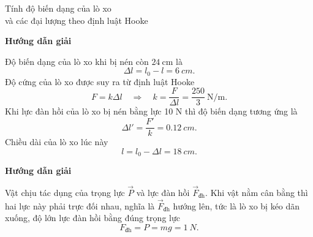 \begin{dang}{Tính độ biến dạng của lò xo \\và các đại lượng theo định luật Hooke}
	{	\begin{center}
			\textbf{Hướng dẫn giải}
		\end{center}
		
		Độ biến dạng của lò xo khi bị nén còn $\SI{24}{\centi\meter}$ là
			\begin{equation*}
				\Delta l = l_0 - l = \SI{6}{cm}.
			\end{equation*}
		Độ cứng của lò xo được suy ra từ định luật Hooke
			\begin{equation*}
				F=k\Delta l \quad\Rightarrow\quad k= \dfrac{F}{\Delta l} = \dfrac{250}{3}\ \text{N/m}.
			\end{equation*}
		Khi lực đàn hồi của lò xo bị nén bằng lực 10 N thì độ biến dạng tương ứng là 
			\begin{equation*}
				\Delta l' =\dfrac{F'}{k} = \SI{0,12}{cm}.
			\end{equation*}
		Chiều dài của lò xo lúc này
			\begin{equation*}
				l=l_0 -\Delta l = \SI{18}{cm}.
			\end{equation*} 
		
	}
	{	\begin{center}
			\textbf{Hướng dẫn giải}
		\end{center}
		
		Vật chịu tác dụng của trọng lực $\vec{P}$ và lực đàn hồi $\vec{F}_{\text{đh}}$. 	Khi vật nằm cân bằng thì hai lực này phải trực đối nhau, nghĩa là $\vec{F}_{\text{đh}}$ hướng lên, tức là lò xo bị kéo dãn xuống, độ lớn lực đàn hồi bằng đúng trọng lực 
			\begin{equation*}
				F_{\text{đh}} = P = mg =\SI{1}{N}.
			\end{equation*}
		
	}
\end{dang}


